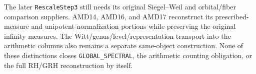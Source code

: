 The later \texttt{RescaleStep3} still needs its original
Siegel--Weil and orbital/fiber comparison suppliers.  AMD14,
AMD16, and AMD17 reconstruct its prescribed-measure and
unipotent-normalization portions while preserving the original
infinity measures.  The Witt/genus/level/representation
transport into the arithmetic columns also remains a separate
same-object construction.  None of these distinctions closes
\texttt{GLOBAL\_SPECTRAL}, the arithmetic counting obligation,
or the full RH/GRH reconstruction by itself.
